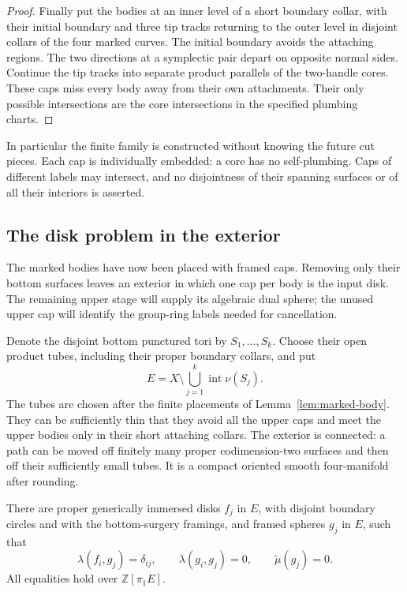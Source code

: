 \begin{proof}
Finally put the bodies at an inner level of a short boundary collar, with
their initial boundary and three tip tracks returning to the outer level
in disjoint collars of the four marked curves. The initial boundary avoids
the attaching regions. The two directions at a symplectic pair depart on
opposite normal sides. Continue the tip tracks into separate product
parallels of the two-handle cores. These caps miss every body away from
their own attachments. Their only possible intersections are the core
intersections in the specified plumbing charts.
\end{proof}

In particular the finite family is constructed without knowing the future
cut pieces. Each cap is individually embedded: a core has no self-plumbing.
Caps of different labels may intersect, and no disjointness of their
spanning surfaces or of all their interiors is asserted.

\subsection{The disk problem in the exterior}

The marked bodies have now been placed with framed caps. Removing only
their bottom surfaces leaves an exterior in which one cap per body is
the input disk. The remaining upper stage will supply its algebraic
dual sphere; the unused upper cap will identify the group-ring labels
needed for cancellation.

Denote the disjoint bottom punctured tori by \(S_1,\ldots,S_k\).
Choose their open product tubes, including their proper boundary collars,
and put
\[
 E=X\setminus\bigcup_{j=1}^k\operatorname{int}\nu(S_j).
\]
The tubes are chosen after the finite placements of
Lemma~\ref{lem:marked-body}. They can be sufficiently thin that they avoid
all the upper caps and meet the upper bodies only in their short attaching
collars. The exterior is connected: a path can be moved off finitely many
proper codimension-two surfaces and then off their sufficiently small
tubes. It is a compact oriented smooth four-manifold after rounding.

\begin{lemma}
\label{lem:exterior-duals}
There are proper generically immersed disks \(f_j\) in \(E\), with
disjoint boundary circles and with the bottom-surgery framings, and framed
spheres \(g_j\) in \(E\), such that
\[
 \lambda(f_i,g_j)=\delta_{ij},\qquad
 \lambda(g_i,g_j)=0,\qquad
 \widetilde\mu(g_j)=0 .
\]
All equalities hold over \(\mathbb Z[\pi_1E]\).
\end{lemma}

